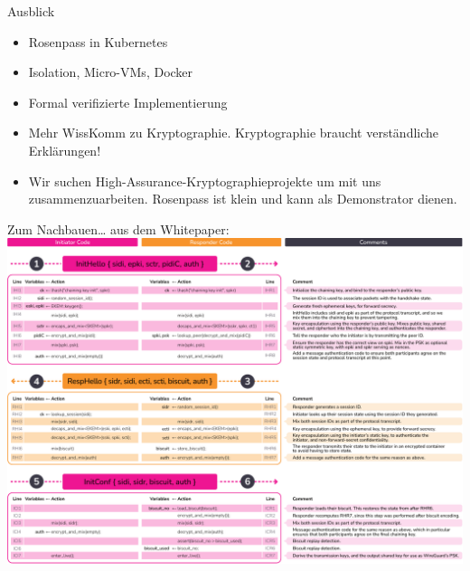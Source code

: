 \documentclass{rosenpass-beamer}
\begin{document}
\begin{frame}{Ausblick}
  \begin{itemize}
    \item Rosenpass in Kubernetes
    \item Isolation, Micro-VMs, Docker
    \item Formal verifizierte Implementierung
  \end{itemize}
  \begin{itemize}
    \item Mehr WissKomm zu Kryptographie. Kryptographie braucht verständliche Erklärungen!
  \end{itemize}
  \begin{itemize}
    \item Wir suchen High-Assurance-Kryptographieprojekte um mit uns zusammenzuarbeiten. Rosenpass ist klein und kann als Demonstrator dienen.
  \end{itemize}
\end{frame}

\begin{frame}{Zum Nachbauen… aus dem Whitepaper:}
  \includegraphics[height=.9\textheight]{graphics/rosenpass-wp-message-handling-code.pdf}
\end{frame}
\end{document}
